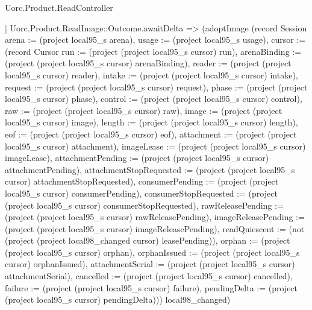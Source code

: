 \begin{lexlean}{Uorc.Product.ReadController}
\begin{semanticmodule}
{      | Uorc.Product.ReadImage::Outcome.awaitDelta => (adoptImage (record Session {arena := (project local95_s arena), usage := (project local95_s usage), cursor := (record Cursor {run := (project (project local95_s cursor) run), arenaBinding := (project (project local95_s cursor) arenaBinding), reader := (project (project local95_s cursor) reader), intake := (project (project local95_s cursor) intake), request := (project (project local95_s cursor) request), phase := (project (project local95_s cursor) phase), control := (project (project local95_s cursor) control), raw := (project (project local95_s cursor) raw), image := (project (project local95_s cursor) image), length := (project (project local95_s cursor) length), eof := (project (project local95_s cursor) eof), attachment := (project (project local95_s cursor) attachment), imageLease := (project (project local95_s cursor) imageLease), attachmentPending := (project (project local95_s cursor) attachmentPending), attachmentStopRequested := (project (project local95_s cursor) attachmentStopRequested), consumerPending := (project (project local95_s cursor) consumerPending), consumerStopRequested := (project (project local95_s cursor) consumerStopRequested), rawReleasePending := (project (project local95_s cursor) rawReleasePending), imageReleasePending := (project (project local95_s cursor) imageReleasePending), readQuiescent := (not (project (project local98_changed cursor) leasePending)), orphan := (project (project local95_s cursor) orphan), orphanIssued := (project (project local95_s cursor) orphanIssued), attachmentSerial := (project (project local95_s cursor) attachmentSerial), cancelled := (project (project local95_s cursor) cancelled), failure := (project (project local95_s cursor) failure), pendingDelta := (project (project local95_s cursor) pendingDelta)})}) local98_changed)
}
\end{semanticmodule}
\end{lexlean}
